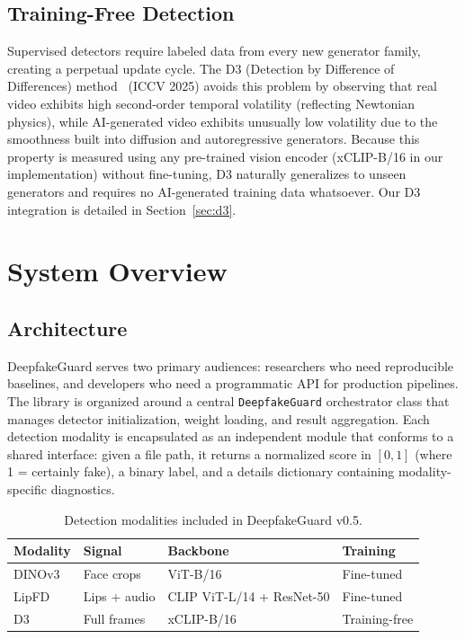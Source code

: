 \documentclass[conference]{IEEEtran}
\begin{document}
\subsection{Training-Free Detection}
Supervised detectors require labeled data from every new generator family, creating a perpetual update cycle. The D3 (Detection by Difference of Differences) method~\cite{zheng2025d3} (ICCV 2025) avoids this problem by observing that real video exhibits high second-order temporal volatility (reflecting Newtonian physics), while AI-generated video exhibits unusually low volatility due to the smoothness built into diffusion and autoregressive generators. Because this property is measured using any pre-trained vision encoder (xCLIP-B/16 in our implementation) without fine-tuning, D3 naturally generalizes to unseen generators and requires no AI-generated training data whatsoever. Our D3 integration is detailed in Section~\ref{sec:d3}.


\section{System Overview} \label{sec:system}

\subsection{Architecture}
DeepfakeGuard serves two primary audiences: researchers who need reproducible baselines, and developers who need a programmatic API for production pipelines. The library is organized around a central \texttt{DeepfakeGuard} orchestrator class that manages detector initialization, weight loading, and result aggregation. Each detection modality is encapsulated as an independent module that conforms to a shared interface: given a file path, it returns a normalized score in $[0, 1]$ (where 1 = certainly fake), a binary label, and a details dictionary containing modality-specific diagnostics.

\begin{table}[!t]
\centering
\caption{Detection modalities included in DeepfakeGuard v0.5.}
\label{tab:modalities}
\begin{tabular}{l@{\hskip 6pt}l@{\hskip 6pt}l@{\hskip 6pt}l}
\toprule
\textbf{Modality} & \textbf{Signal} & \textbf{Backbone} & \textbf{Training} \\
\midrule
DINOv3      & Face crops  & ViT-B/16         & Fine-tuned \\
LipFD       & Lips + audio & CLIP ViT-L/14 + ResNet-50 & Fine-tuned \\
D3          & Full frames & xCLIP-B/16       & Training-free \\
\bottomrule
\end{tabular}
\end{table}
\end{document}
